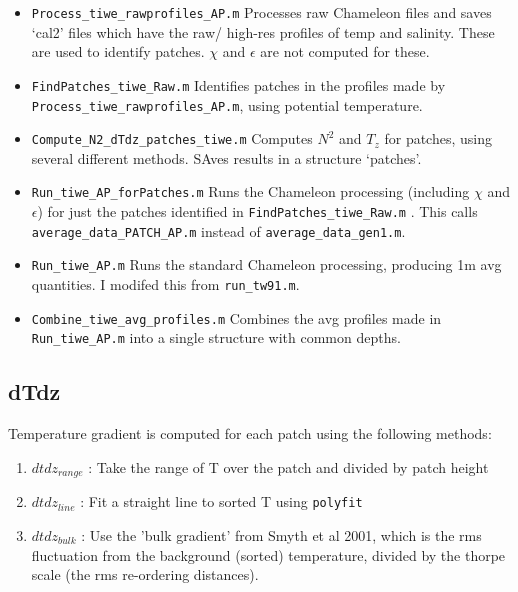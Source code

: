 \documentclass[11pt]{article}
\begin{document}
\begin{itemize}

\item \verb+Process_tiwe_rawprofiles_AP.m+  Processes raw Chameleon files and saves `cal2' files which have the raw/ high-res profiles of temp and salinity. These are used to identify patches. $\chi$ and $\epsilon$ are not computed for these.

\item \verb+FindPatches_tiwe_Raw.m+ Identifies patches in the profiles made by \verb+Process_tiwe_rawprofiles_AP.m+, using potential temperature.

\item \verb+Compute_N2_dTdz_patches_tiwe.m+ Computes $N^2$ and $T_z$ for patches, using several different methods. SAves results in a structure `patches'.

\item \verb+Run_tiwe_AP_forPatches.m+ Runs the Chameleon processing (including $\chi$ and $\epsilon$) for just the patches identified in \verb+FindPatches_tiwe_Raw.m+ . This calls \verb+average_data_PATCH_AP.m+ instead of \verb+average_data_gen1.m+.

\item \verb+Run_tiwe_AP.m+ Runs the standard Chameleon processing, producing 1m avg quantities. I modifed this from \verb+run_tw91.m+.

\item \verb+Combine_tiwe_avg_profiles.m+ Combines the avg profiles made in \verb+Run_tiwe_AP.m+ into a single structure with common depths.


\end{itemize}

\medskip


\subsection{dTdz}

Temperature gradient is computed for each patch using the following methods:
\begin{enumerate}
\item $dtdz_{range}$ : Take the range of T over the patch and divided by patch height
\item $dtdz_{line}$ : Fit a straight line to sorted T using \verb+polyfit+
\item $dtdz_{bulk}$ : Use the 'bulk gradient' from Smyth et al 2001, which is the rms fluctuation from the background (sorted) temperature, divided by the thorpe scale (the rms re-ordering distances).
\end{enumerate}
\end{document}
